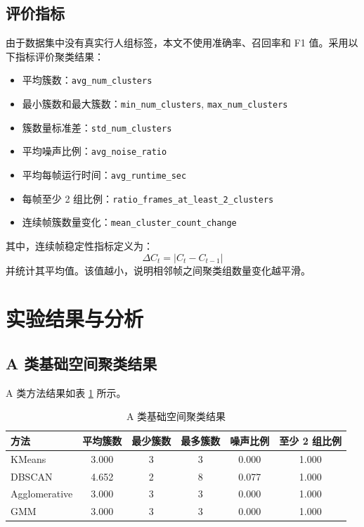 \documentclass[UTF8,a4paper,12pt]{ctexart}
\begin{document}
\subsection{评价指标}

由于数据集中没有真实行人组标签，本文不使用准确率、召回率和 F1 值。采用以下指标评价聚类结果：

\begin{itemize}
    \item 平均簇数：\texttt{avg\_num\_clusters}
    \item 最小簇数和最大簇数：\texttt{min\_num\_clusters}, \texttt{max\_num\_clusters}
    \item 簇数量标准差：\texttt{std\_num\_clusters}
    \item 平均噪声比例：\texttt{avg\_noise\_ratio}
    \item 平均每帧运行时间：\texttt{avg\_runtime\_sec}
    \item 每帧至少 2 组比例：\texttt{ratio\_frames\_at\_least\_2\_clusters}
    \item 连续帧簇数量变化：\texttt{mean\_cluster\_count\_change}
\end{itemize}

其中，连续帧稳定性指标定义为：
\begin{equation}
\Delta C_t = |C_t - C_{t-1}|
\end{equation}
并统计其平均值。该值越小，说明相邻帧之间聚类组数量变化越平滑。

\section{实验结果与分析}

\subsection{A 类基础空间聚类结果}

A 类方法结果如表 \ref{tab:a-baseline} 所示。

\begin{table}[H]
\centering
\caption{A 类基础空间聚类结果}
\label{tab:a-baseline}
\begin{tabular}{lccccc}
\toprule
方法 & 平均簇数 & 最少簇数 & 最多簇数 & 噪声比例 & 至少 2 组比例 \\
\midrule
KMeans & 3.000 & 3 & 3 & 0.000 & 1.000 \\
DBSCAN & 4.652 & 2 & 8 & 0.077 & 1.000 \\
Agglomerative & 3.000 & 3 & 3 & 0.000 & 1.000 \\
GMM & 3.000 & 3 & 3 & 0.000 & 1.000 \\
\bottomrule
\end{tabular}
\end{table}
\end{document}

